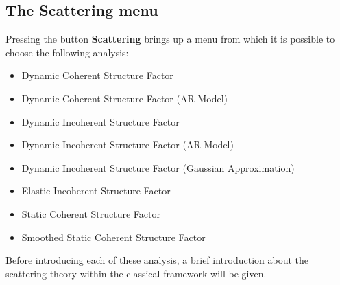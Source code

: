 \documentclass[a4paper,11pt]{report}
\begin{document}
\subsection{The Scattering menu}
\label{scattering_menu}
Pressing the button \textbf{Scattering} brings up a menu from which it is possible to choose the following analysis:
\begin{itemize}
\item Dynamic Coherent Structure Factor
\item Dynamic Coherent Structure Factor (AR Model)
\item Dynamic Incoherent Structure Factor
\item Dynamic Incoherent Structure Factor (AR Model)
\item Dynamic Incoherent Structure Factor (Gaussian Approximation)
\item Elastic Incoherent Structure Factor
\item Static Coherent Structure Factor
\item Smoothed Static Coherent Structure Factor
\end{itemize}
Before introducing each of these analysis, a brief introduction about the scattering theory within the classical framework will be given.
\end{document}
